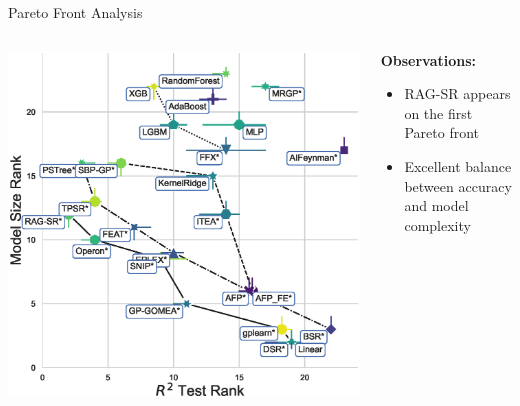 \documentclass[aspectratio=1610]{beamer}
\begin{document}
    \begin{frame}{Pareto Front Analysis}
        \begin{columns}
            \begin{column}{0.48\textwidth}
                \begin{center}
                    \includegraphics[width=\textwidth]{figs/pareto_plot_r2_test_rank_model_size_rank.eps}
                \end{center}
            \end{column}

            \begin{column}{0.48\textwidth}
                \textbf{Observations:}
                \begin{itemize}
                    \item RAG-SR appears on the first Pareto front
                    \item Excellent balance between accuracy and model complexity
                \end{itemize}
            \end{column}
        \end{columns}
    \end{frame}
\end{document}
